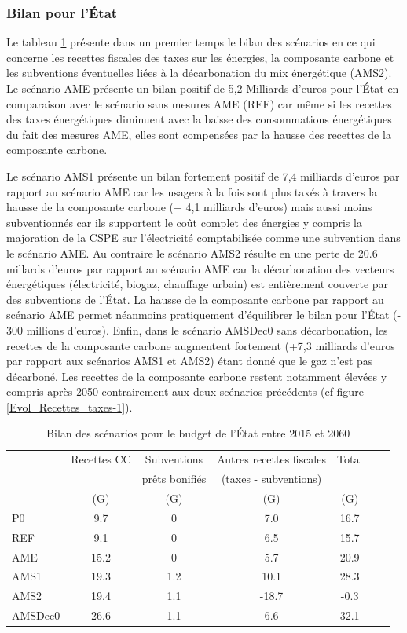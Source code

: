 \documentclass[10.5pt,a4paper]{article}
\def\euro{\mbox{\raisebox{.25ex}{{\it =}}\hspace{-.5em}{\sf C}}}
\begin{document}
{\subsubsection{Bilan pour l’État}

Le tableau \ref{Bilan_Etat} présente dans un premier temps le bilan des scénarios en ce qui concerne les recettes fiscales des taxes sur les énergies, la composante carbone et les subventions éventuelles liées à la décarbonation du mix énergétique (AMS2).  Le scénario AME présente un bilan positif de 5,2 Milliards d'euros pour l’État en comparaison avec le scénario sans mesures AME (REF) car même si les recettes des taxes énergétiques diminuent avec la baisse des consommations énergétiques du fait des mesures AME, elles sont compensées par la hausse des recettes de la composante carbone. 

Le scénario AMS1 présente un bilan fortement positif de 7,4 milliards d'euros par rapport au scénario AME car les usagers à la fois sont plus taxés à travers la hausse de la composante carbone (+ 4,1 milliards d'euros) mais aussi moins subventionnés car ils supportent le coût complet des énergies y compris la majoration de la CSPE sur l'électricité comptabilisée comme une subvention dans le scénario AME. Au contraire le scénario AMS2 résulte en une perte de 20.6 millards d'euros par rapport au scénario AME car la décarbonation des vecteurs énergétiques (électricité, biogaz, chauffage urbain) est entièrement couverte par des subventions de l’État. La hausse de la composante carbone par rapport au scénario AME permet néanmoins pratiquement d'équilibrer le bilan pour l’État (- 300 millions d'euros). Enfin, dans le scénario AMSDec0 sans décarbonation, les recettes de la composante carbone augmentent fortement (+7,3 milliards d'euros par rapport aux scénarios AMS1 et AMS2) étant donné que le gaz n'est pas décarboné. Les recettes de la composante carbone restent notamment élevées y compris après 2050 contrairement aux deux scénarios précédents (cf figure \ref{Evol_Recettes_taxes-1}). 



\begin{table}[h] \caption{Bilan des scénarios pour le budget de l’État entre 2015 et 2060}\label{Bilan_Etat}
\begin{center}
\begin{tabular}[c]{|l|c|c|c|c|c|c|}
\hline
								&Recettes CC & Subventions  &Autres recettes fiscales & Total \\
								& 					 & prêts bonifiés & (taxes - subventions) & \\
								&		(G\euro) &			(G\euro) 	& (G\euro) 					& (G\euro)	 \\			
\hline
P0 &9.7 & 0 &7.0 &16.7 \\
REF & 9.1 & 0 &6.5 &15.7 \\
AME &15.2 & 0&5.7 &20.9 \\
AMS1 &19.3 &1.2 &10.1 &28.3 \\
AMS2 &19.4 & 1.1&-18.7 &-0.3 \\
AMSDec0 &26.6 & 1.1 &6.6 &32.1 \\
\hline
\end{tabular}
\end{center}


\end{table}}
\end{document}
